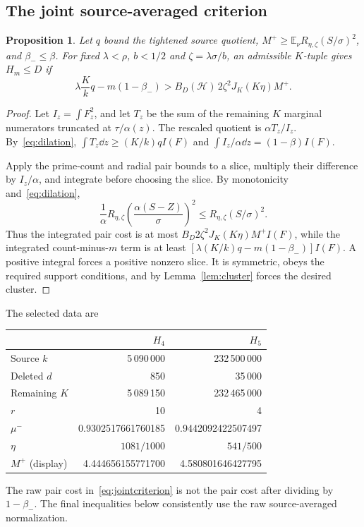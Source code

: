 \documentclass[11pt,a4paper]{article}
\newtheorem{proposition}[theorem]{Proposition}
\theoremstyle{definition}\newtheorem{definition}[theorem]{Definition}
\theoremstyle{remark}\newtheorem{remark}[theorem]{Remark}
\newcommand{\E}{\mathbb E}\newcommand{\Prob}{\mathbb P}
\newcommand{\smalltable}{\small\setlength{\tabcolsep}{5pt}}
\numberwithin{equation}{section}
\begin{document}
\subsection{The joint source-averaged criterion}
\begin{proposition}\label{prop:joint}
Let $q$ bound the tightened source quotient, $M^+\ge\E_\nu R_{\eta,\zeta}(S/\sigma)^2$, and $\beta_-\le\beta$. For fixed $\lambda<\rho$, $b<1/2$ and $\zeta=\lambda\sigma/b$, an admissible $K$-tuple gives $H_m\le D$ if
\begin{equation}\label{eq:jointcriterion}
 \lambda\frac Kk q-m(1-\beta_-)
 >B_D(\mathcal H)\,2\zeta^2J_K(K\eta)M^+.
\end{equation}
\end{proposition}
\begin{proof}
Let $I_z=\int F_z^2$, and let $T_z$ be the sum of the remaining $K$ marginal numerators truncated at $\tau/\alpha(z)$. The rescaled quotient is $\alpha T_z/I_z$. By~\eqref{eq:dilation}, $\int T_z\dd z\ge(K/k)qI(F)$ and $\int I_z/\alpha\dd z=(1-\beta)I(F)$.

Apply the prime-count and radial pair bounds to a slice, multiply their difference by $I_z/\alpha$, and integrate before choosing the slice. By monotonicity and~\eqref{eq:dilation},
\[
 \frac1\alpha R_{\eta,\zeta}\left(\frac{\alpha(S-Z)}\sigma\right)^2
 \le R_{\eta,\zeta}(S/\sigma)^2.
\]
Thus the integrated pair cost is at most
$B_D2\zeta^2J_K(K\eta)M^+I(F)$, while the integrated count-minus-$m$ term is at least
$[\lambda(K/k)q-m(1-\beta_-)]I(F)$.
A positive integral forces a positive nonzero slice. It is symmetric, obeys the required support conditions, and by Lemma~\ref{lem:cluster} forces the desired cluster.
\end{proof}

The selected data are
\begin{center}\smalltable
\begin{tabular}{@{}lrr@{}}\toprule
&$H_4$&$H_5$\\\midrule
Source $k$&5\,090\,000&232\,500\,000\\
Deleted $d$&850&35\,000\\
Remaining $K$&5\,089\,150&232\,465\,000\\
$r$&10&4\\
$\mu^-$&0.9302517661760185&0.9442092422507497\\
$\eta$&$1081/1000$&$541/500$\\
$M^+$ (display)&4.444656155771700&4.580801646427795\\\bottomrule
\end{tabular}\end{center}
The raw pair cost in~\eqref{eq:jointcriterion} is not the pair cost after dividing by $1-\beta_-$. The final inequalities below consistently use the raw source-averaged normalization.
\end{document}
